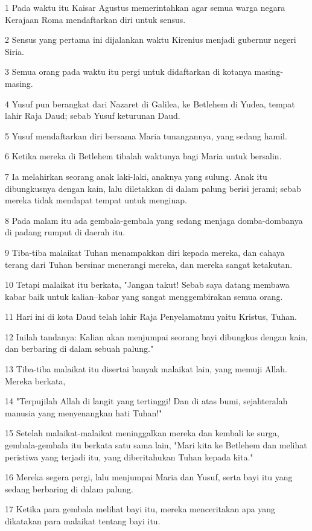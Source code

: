 \par 1 Pada waktu itu Kaisar Agustus memerintahkan agar semua warga negara Kerajaan Roma mendaftarkan diri untuk sensus.
\par 2 Sensus yang pertama ini dijalankan waktu Kirenius menjadi gubernur negeri Siria.
\par 3 Semua orang pada waktu itu pergi untuk didaftarkan di kotanya masing-masing.
\par 4 Yusuf pun berangkat dari Nazaret di Galilea, ke Betlehem di Yudea, tempat lahir Raja Daud; sebab Yusuf keturunan Daud.
\par 5 Yusuf mendaftarkan diri bersama Maria tunangannya, yang sedang hamil.
\par 6 Ketika mereka di Betlehem tibalah waktunya bagi Maria untuk bersalin.
\par 7 Ia melahirkan seorang anak laki-laki, anaknya yang sulung. Anak itu dibungkusnya dengan kain, lalu diletakkan di dalam palung berisi jerami; sebab mereka tidak mendapat tempat untuk menginap.
\par 8 Pada malam itu ada gembala-gembala yang sedang menjaga domba-dombanya di padang rumput di daerah itu.
\par 9 Tiba-tiba malaikat Tuhan menampakkan diri kepada mereka, dan cahaya terang dari Tuhan bersinar menerangi mereka, dan mereka sangat ketakutan.
\par 10 Tetapi malaikat itu berkata, "Jangan takut! Sebab saya datang membawa kabar baik untuk kalian--kabar yang sangat menggembirakan semua orang.
\par 11 Hari ini di kota Daud telah lahir Raja Penyelamatmu yaitu Kristus, Tuhan.
\par 12 Inilah tandanya: Kalian akan menjumpai seorang bayi dibungkus dengan kain, dan berbaring di dalam sebuah palung."
\par 13 Tiba-tiba malaikat itu disertai banyak malaikat lain, yang memuji Allah. Mereka berkata,
\par 14 "Terpujilah Allah di langit yang tertinggi! Dan di atas bumi, sejahteralah manusia yang menyenangkan hati Tuhan!"
\par 15 Setelah malaikat-malaikat meninggalkan mereka dan kembali ke surga, gembala-gembala itu berkata satu sama lain, "Mari kita ke Betlehem dan melihat peristiwa yang terjadi itu, yang diberitahukan Tuhan kepada kita."
\par 16 Mereka segera pergi, lalu menjumpai Maria dan Yusuf, serta bayi itu yang sedang berbaring di dalam palung.
\par 17 Ketika para gembala melihat bayi itu, mereka menceritakan apa yang dikatakan para malaikat tentang bayi itu.
